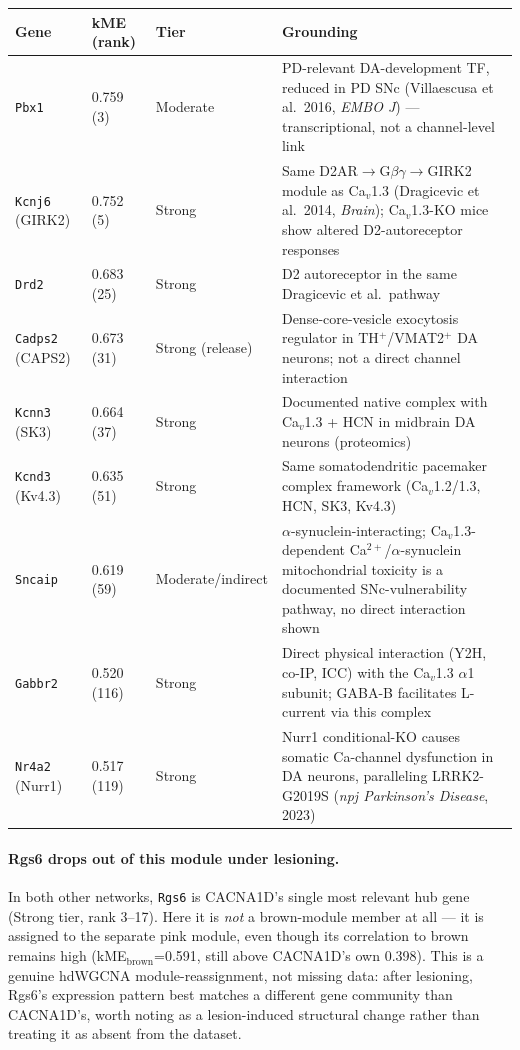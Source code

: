 \documentclass[11pt]{article}
\begin{document}
\begin{table}[h]
\centering
\begin{tabular}{llll}
\toprule
Gene & kME (rank) & Tier & Grounding \\
\midrule
\texttt{Pbx1} & 0.759 (3) & Moderate & PD-relevant DA-development TF, reduced in PD SNc (Villaescusa et al.\ 2016, \emph{EMBO J}) --- transcriptional, not a channel-level link \\
\texttt{Kcnj6} (GIRK2) & 0.752 (5) & Strong & Same D2AR$\to$G$\beta\gamma\to$GIRK2 module as Ca$_v$1.3 (Dragicevic et al.\ 2014, \emph{Brain}); Ca$_v$1.3-KO mice show altered D2-autoreceptor responses \\
\texttt{Drd2} & 0.683 (25) & Strong & D2 autoreceptor in the same Dragicevic et al.\ pathway \\
\texttt{Cadps2} (CAPS2) & 0.673 (31) & Strong (release) & Dense-core-vesicle exocytosis regulator in TH$^+$/VMAT2$^+$ DA neurons; not a direct channel interaction \\
\texttt{Kcnn3} (SK3) & 0.664 (37) & Strong & Documented native complex with Ca$_v$1.3 + HCN in midbrain DA neurons (proteomics) \\
\texttt{Kcnd3} (Kv4.3) & 0.635 (51) & Strong & Same somatodendritic pacemaker complex framework (Ca$_v$1.2/1.3, HCN, SK3, Kv4.3) \\
\texttt{Sncaip} & 0.619 (59) & Moderate/indirect & $\alpha$-synuclein-interacting; Ca$_v$1.3-dependent Ca$^{2+}$/$\alpha$-synuclein mitochondrial toxicity is a documented SNc-vulnerability pathway, no direct interaction shown \\
\texttt{Gabbr2} & 0.520 (116) & Strong & Direct physical interaction (Y2H, co-IP, ICC) with the Ca$_v$1.3 $\alpha$1 subunit; GABA-B facilitates L-current via this complex \\
\texttt{Nr4a2} (Nurr1) & 0.517 (119) & Strong & Nurr1 conditional-KO causes somatic Ca-channel dysfunction in DA neurons, paralleling LRRK2-G2019S (\emph{npj Parkinson's Disease}, 2023) \\
\bottomrule
\end{tabular}
\end{table}

\paragraph{Rgs6 drops out of this module under lesioning.} In both other
networks, \texttt{Rgs6} is CACNA1D's single most relevant hub gene (Strong
tier, rank 3--17). Here it is \emph{not} a brown-module member at all --- it
is assigned to the separate pink module, even though its correlation to
brown remains high (kME$_{\mathrm{brown}}$=0.591, still above CACNA1D's own
0.398). This is a genuine hdWGCNA module-reassignment, not missing data:
after lesioning, Rgs6's expression pattern best matches a different gene
community than CACNA1D's, worth noting as a lesion-induced structural change
rather than treating it as absent from the dataset.
\end{document}
